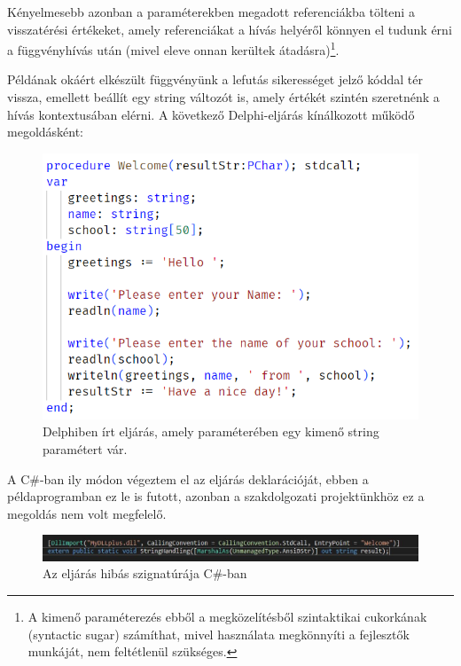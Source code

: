 \documentclass[tocnopagenum]{thesis-ekf}
\theoremstyle{definition}
\theoremstyle{remark}
\begin{document}
	Kényelmesebb azonban a paraméterekben megadott referenciákba tölteni a visszatérési értékeket, amely referenciákat a hívás helyéről könnyen el tudunk érni a függvényhívás után (mivel eleve onnan kerültek átadásra)\footnote{A kimenő paraméterezés ebből a megközelítésből szintaktikai cukorkának (syntactic sugar) számíthat, mivel használata megkönnyíti a fejlesztők munkáját, nem feltétlenül szükséges.}.
	
	Példának okáért elkészült függvényünk a lefutás sikerességet jelző kóddal tér vissza, emellett beállít egy string változót is, amely értékét szintén szeretnénk a hívás kontextusában elérni. A következő Delphi-eljárás kínálkozott működő megoldásként:
	\begin{figure}[h!]
		\centering
		\includegraphics[scale=0.9]{hibas_string_delphi}
		\caption{Delphiben írt eljárás, amely paraméterében egy kimenő string paramétert vár.}
		\label{hibas_string_delphi}
	\end{figure}
	A C\#-ban ily módon végeztem el az eljárás deklarációját, ebben a példaprogramban ez le is futott, azonban a szakdolgozati projektünkhöz ez a megoldás nem volt megfelelő.
	\begin{figure}[h!]
		\centering
		\includegraphics[scale=0.75]{hibas_string_csharp}
		\caption{Az eljárás hibás szignatúrája C\#-ban}
		\label{hibas_string_csharp}
	\end{figure}
\end{document}
